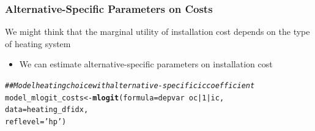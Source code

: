 \documentclass{beamer}\usepackage[]{graphicx}\usepackage[]{color}
\makeatletter
\newcommand{\hlnum}[1]{\textcolor[rgb]{0.686,0.059,0.569}{#1}}%
\newcommand{\hlstr}[1]{\textcolor[rgb]{0.192,0.494,0.8}{#1}}%
\newcommand{\hlcom}[1]{\textcolor[rgb]{0.678,0.584,0.686}{\textit{#1}}}%
\newcommand{\hlopt}[1]{\textcolor[rgb]{0,0,0}{#1}}%
\newcommand{\hlstd}[1]{\textcolor[rgb]{0.345,0.345,0.345}{#1}}%
\newcommand{\hlkwb}[1]{\textcolor[rgb]{0.69,0.353,0.396}{#1}}%
\newcommand{\hlkwc}[1]{\textcolor[rgb]{0.333,0.667,0.333}{#1}}%
\newcommand{\hlkwd}[1]{\textcolor[rgb]{0.737,0.353,0.396}{\textbf{#1}}}%
\newenvironment{kframe}{%
 \def\at@end@of@kframe{}%
 \ifinner\ifhmode%
  \def\at@end@of@kframe{\end{minipage}}%
  \begin{minipage}{\columnwidth}%
 \fi\fi%
 \def\FrameCommand##1{\hskip\@totalleftmargin \hskip-\fboxsep
 \colorbox{shadecolor}{##1}\hskip-\fboxsep
     \hskip-\linewidth \hskip-\@totalleftmargin \hskip\columnwidth}%
 \MakeFramed {\advance\hsize-\width
   \@totalleftmargin\z@ \linewidth\hsize
   \@setminipage}}%
 {\par\unskip\endMakeFramed%
 \at@end@of@kframe}
\newenvironment{knitrout}{}{} %
\makeatother
\begin{document}
\begin{frame}[fragile]\frametitle{Alternative-Specific Parameters on Costs}
	We might think that the marginal utility of installation cost depends on the type of heating system
	\begin{itemize}
		\item We can estimate alternative-specific parameters on installation cost
	\end{itemize}
\begin{knitrout}\footnotesize
{}\color{fgcolor}\begin{kframe}
\begin{alltt}
\hlcom{## Model heating choice with alternative-specific ic coefficient}
\hlstd{model_mlogit_costs} \hlkwb{<-} \hlkwd{mlogit}\hlstd{(}\hlkwc{formula} \hlstd{= depvar} \hlopt{~} \hlstd{oc} \hlopt{|} \hlnum{1} \hlopt{|} \hlstd{ic,}
                             \hlkwc{data} \hlstd{= heating_dfidx,}
                             \hlkwc{reflevel} \hlstd{=} \hlstr{'hp'}\hlstd{)}
\end{alltt}
\end{kframe}
\end{knitrout}
\end{frame}
\end{document}

